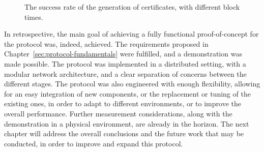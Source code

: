 \begin{figure} [h!]
    \begin{center}
        \caption{The success rate of the generation of \pol{} certificates, with different block times.}
        \label{fig:block-time-success-rate}
    \end{center}
\end{figure}

In retrospective, the main goal of achieving a fully functional proof-of-concept for the \pol{} protocol was, indeed, achieved. The requirements proposed in Chapter~\ref{sec:protocol-fundamentals} were fulfilled, and a demonstration was made possible. The protocol was implemented in a distributed setting, with a modular network architecture, and a clear separation of concerns between the different stages. The protocol was also engineered with enough flexibility, allowing for an easy integration of new components, or the replacement or tuning of the existing ones, in order to adapt to different environments, or to improve the overall performance. Further measurement considerations, along with the demonstration in a physical environment, are already in the horizon. The next chapter will address the overall conclusions and the future work that may be conducted, in order to improve and expand this \pol{} protocol.


    
